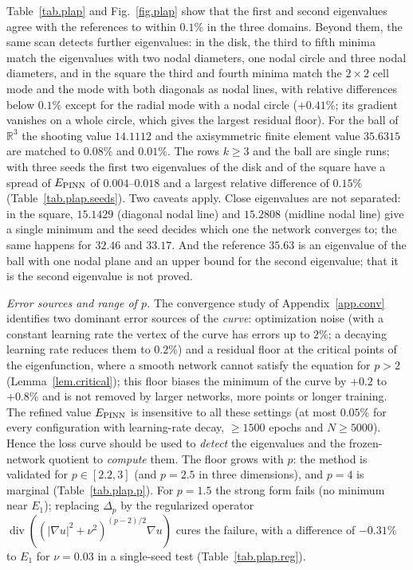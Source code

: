 \documentclass[10pt]{amsart}
\theoremstyle{definition}
\theoremstyle{remark}
\theoremstyle{plain}
\newcommand{\R}{\mathbb{R}}
\begin{document}
Table~\ref{tab.plap} and Fig.~\ref{fig.plap} show that the first and second eigenvalues agree with
the references to within $0.1\%$ in the three domains. Beyond them, the same scan detects further
eigenvalues: in the disk, the third to fifth minima match the eigenvalues with two nodal diameters,
one nodal circle and three nodal diameters, and in the square the third and fourth minima match the
$2\times2$ cell mode and the mode with both diagonals as nodal lines, with relative differences
below $0.1\%$ except for the radial mode with a nodal circle ($+0.41\%$; its gradient vanishes on a
whole circle, which gives the largest residual floor). For the ball of $\R^3$ the shooting value
$14.1112$ and the axisymmetric finite element value $35.6315$ are matched to $0.08\%$ and $0.01\%$.
The rows $k\ge3$ and the ball are single runs; with three seeds the first two eigenvalues of the disk
and of the square have a spread of $E_{\rm PINN}$ of $0.004$--$0.018$ and a largest relative difference of
$0.15\%$ (Table~\ref{tab.plap.seeds}). Two caveats apply. Close eigenvalues are not separated: in the
square, $15.1429$ (diagonal nodal line) and $15.2808$ (midline nodal line) give a single minimum and the
seed decides which one the network converges to; the same happens for $32.46$ and $33.17$. And the
reference $35.63$ is an eigenvalue of the ball with one nodal plane and an upper bound for the second
eigenvalue; that it is the second eigenvalue is not proved.

\emph{Error sources and range of $p$.} The convergence study of Appendix~\ref{app.conv} identifies two
dominant error sources of the \emph{curve}: optimization noise (with a constant learning rate the vertex
of the curve has errors up to $2\%$; a decaying learning rate reduces them to $0.2\%$) and a residual
floor at the critical points of the eigenfunction, where a smooth network cannot satisfy the equation
for $p>2$ (Lemma~\ref{lem.critical}); this floor biases the minimum of the curve by $+0.2$ to $+0.8\%$ and
is not removed by larger networks, more points or longer training. The refined value $E_{\rm PINN}$ is
insensitive to all these settings (at most $0.05\%$ for every configuration with learning-rate decay,
$\ge1500$ epochs and $N\ge5000$). Hence the loss curve should be used to \emph{detect} the eigenvalues and
the frozen-network quotient to \emph{compute} them. The floor grows with $p$: the method is validated
for $p\in[2.2,3]$ (and $p=2.5$ in three dimensions), and $p=4$ is marginal (Table~\ref{tab.plap.p}). For
$p=1.5$ the strong form fails (no minimum near $E_1$); replacing $\Delta_p$ by the regularized operator
$\operatorname{div}((|\nabla u|^2+\nu^2)^{(p-2)/2}\nabla u)$ cures the failure, with a difference of
$-0.31\%$ to $E_1$ for $\nu=0.03$ in a single-seed test (Table~\ref{tab.plap.reg}).
\end{document}
